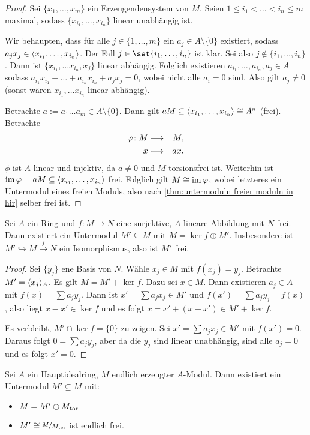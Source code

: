 \documentclass[12pt,a4paper]{scrartcl}
\theoremstyle{cplain}
\theoremstyle{cdef}
\begin{document}
\begin{proof}
	Sei $\{x_1,\dots, x_m\}$ ein Erzeugendensystem von $M$. Seien $1\leq i_1<\dots<i_n\leq m$ maximal, sodass $\{x_{i_1},\dots, x_{i_n}\}$ linear unabhängig ist.
	
	Wir behaupten, dass für alle $j\in\{1,\dots, m\}$ ein $a_j\in A\setminus \{0\}$ existiert, sodass $a_jx_j\in\langle x_{i_1},\dots, x_{i_n}\rangle$. Der Fall $j \in \set{i_1,\ldots,i_n}$ ist klar. Sei also $j\notin \{i_1,\dots, i_n\}$. Dann ist $\{x_{i_1},\dots x_{i_n}, x_j\}$ linear abhängig. Folglich existieren $a_{i_1},\dots, a_{i_n}, a_j\in A$ sodass $a_{i_1}x_{i_1}+\dots+a_{i_n}x_{i_n}+a_jx_j = 0$, wobei nicht alle $a_i = 0$ sind. Also gilt $a_j\neq 0$ (sonst wären $x_{i_1},\dots x_{i_n}$ linear abhängig).
	
	Betrachte $a := a_1\dots a_m\in A\setminus\{0\}$. Dann gilt $aM\subseteq\langle x_{i_1},\dots, x_{i_n}\rangle\cong A^n$ (frei). Betrachte
	\begin{eqnarray*}
		\varphi\colon M & \longrightarrow & M,\\
		x & \longmapsto & ax.
	\end{eqnarray*}
	$\phi$ ist $A$-linear und injektiv, da $a \neq 0$ und $M$ torsionsfrei ist. Weiterhin ist $\operatorname{im}\varphi = aM\subseteq \langle x_{i_1},\dots, x_{i_n}\rangle$ frei. Folglich gilt $M\cong \operatorname{im}\varphi$, wobei letzteres ein Untermodul eines freien Moduls, also nach \cref{thm:untermoduln freier moduln in hir} selber frei ist.
\end{proof}
\begin{lem} \label{lem:4.8}
	Sei $A$ ein Ring und $f\colon M\to N$ eine surjektive, $A$-lineare Abbildung mit $N$ frei. Dann existiert ein Untermodul $M'\subseteq M$ mit $M = \ker f\oplus M'$. Insbesondere ist $M'\hookrightarrow M\xrightarrow{f}N$ ein Isomorphismus, also ist $M'$ frei.
\end{lem}
\begin{proof}
	Sei $\{y_j\}$ ene Basis von $N$. Wähle $x_j\in M$ mit $f(x_j) = y_j$. Betrachte $M'= \langle x_j\rangle_A$. Es gilt $M = M' + \ker f$. Dazu sei $x\in M$. Dann existieren $a_j\in A$ mit $f(x)= \sum a_jy_j$. Dann ist $x'=\sum a_jx_j\in M'$ und $f(x') = \sum a_jy_j = f(x)$, also liegt $x-x'\in \ker f$ und es folgt $x = x'+(x-x')\in M'+\ker f$.
	
	Es verbleibt, $M'\cap \ker f = \{0\}$ zu zeigen. Sei $x' = \sum a_jx_j\in M'$ mit $f(x') = 0$. Daraus folgt $0 = \sum a_jy_j$, aber da die $y_j$ sind linear unabhängig, sind alle $a_j = 0$ und es folgt $x' = 0$.
\end{proof}
\begin{satz}
	Sei $A$ ein Hauptidealring, $M$ endlich erzeugter $A$-Modul. Dann existiert ein Untermodul $M'\subseteq M$ mit:
	\begin{itemize}
		\item $M = M'\oplus M_{\operatorname{tor}}$
		\item $M'\cong \nicefrac{M}{M_{\operatorname{tor}}}$ ist endlich frei.
	\end{itemize}
\end{satz}
\end{document}

